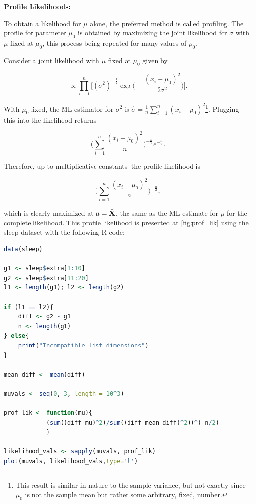 \documentclass{homework}
\begin{document}
\underline{\textbf{Profile Likelihoods:}}

To obtain a likelihood for $\mu$ alone, the preferred method is called profiling. The profile for parameter $\mu_0$ is obtained by maximizing the joint likelihood for $\sigma$ with $\mu$ fixed at $\mu_0$, this process being repeated for many values of $\mu_0$.

Consider a joint likelihood with $\mu$ fixed at $\mu_0$ given by 

$$
\propto \prod_{i=1}^{n} \Bigg[(\sigma^2)^{-\frac{1}{2}} \exp\bigg(-\frac{(x_i-\mu_0)^2}{2\sigma^2}\bigg)\bigg].
$$

With $\mu_0$ fixed, the ML estimator for $\sigma^2$ is $\hat{\sigma} = \frac{1}{n} \sum_{i=1}^{n} (x_i-\mu_0)^2$\footnote{This result is similar in nature to the sample variance, but not exactly since $\mu_0$ is not the sample mean but rather some arbitrary, fixed, number.}. Plugging this into the likelihood returns 

$$
\bigg(\sum_{i=1}^{n} \frac{(x_i-\mu_0)^2}{n}\bigg)^{-\frac{n}{2}} e^{-\frac{n}{2}}.
$$

Therefore, up-to multiplicative constants, the profile likelihood is

$$
\bigg(\sum_{i=1}^{n} \frac{(x_i-\mu_0)^2}{n}\bigg)^{-\frac{n}{2}},
$$

which is clearly maximized at $\mu = \bar{{\bf X}}$, the same as the ML estimate for $\mu$ for the complete likelihood. This profile likelihood is presented at \ref{fig:prof_lik} using the sleep dataset with the following R code:

\begin{lstlisting}[language=R]
data(sleep)

g1 <- sleep$extra[1:10]
g2 <- sleep$extra[11:20]
l1 <- length(g1); l2 <- length(g2)

if (l1 == l2){
    diff <- g2 - g1
    n <- length(g1)
} else{
    print("Incompatible list dimensions")
} 

mean_diff <- mean(diff)

muvals <- seq(0, 3, length = 10^3)

prof_lik <- function(mu){
            (sum((diff-mu)^2)/sum((diff-mean_diff)^2))^(-n/2)
            }

likelihood_vals <- sapply(muvals, prof_lik)
plot(muvals, likelihood_vals,type='l')
\end{lstlisting}
\end{document}
